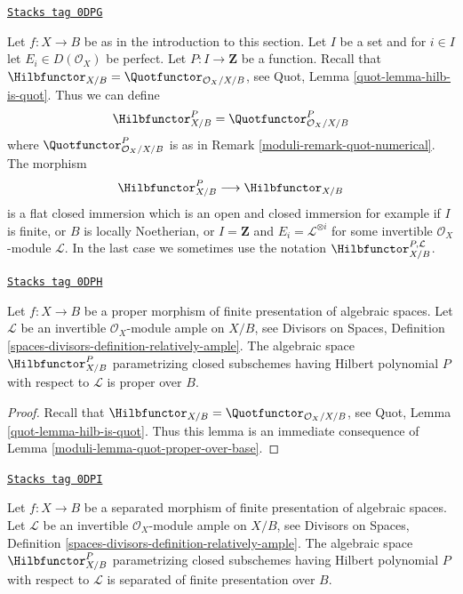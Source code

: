 \begin{remark}

\label{moduli-remark-hilb-numerical}
\href{https://stacks.math.columbia.edu/tag/0DPG}{\texttt{Stacks tag 0DPG}}

Let $f : X \to B$ be as in the introduction to this section.
Let $I$ be a set and for $i \in I$ let $E_i \in D(\mathcal{O}_X)$ be perfect.
Let $P : I \to \mathbf{Z}$ be a function. Recall that
$\Hilbfunctor_{X/B} = \Quotfunctor_{\mathcal{O}_X/X/B}$, see
Quot, Lemma \ref{quot-lemma-hilb-is-quot}.
Thus we can define
$$
\Hilbfunctor^P_{X/B} = \Quotfunctor^P_{\mathcal{O}_X/X/B}
$$
where $\Quotfunctor^P_{\mathcal{O}_X/X/B}$ is as in
Remark \ref{moduli-remark-quot-numerical}. The morphism
$$
\Hilbfunctor^P_{X/B} \longrightarrow \Hilbfunctor_{X/B}
$$
is a flat closed immersion which is an open and closed immersion
for example if $I$ is finite, or $B$ is locally Noetherian, or
$I = \mathbf{Z}$ and $E_i = \mathcal{L}^{\otimes i}$ for some
invertible $\mathcal{O}_X$-module $\mathcal{L}$. In the last case
we sometimes use the notation $\Hilbfunctor^{P, \mathcal{L}}_{X/B}$.
\end{remark}

\begin{lemma}
\label{moduli-lemma-hilb-proper-over-base}
\href{https://stacks.math.columbia.edu/tag/0DPH}{\texttt{Stacks tag 0DPH}}

Let $f : X \to B$ be a proper morphism of finite presentation
of algebraic spaces. Let $\mathcal{L}$ be an invertible
$\mathcal{O}_X$-module ample on $X/B$, see
Divisors on Spaces, Definition
\ref{spaces-divisors-definition-relatively-ample}.
The algebraic space $\Hilbfunctor^P_{X/B}$
parametrizing closed subschemes
having Hilbert polynomial $P$ with respect to $\mathcal{L}$
is proper over $B$.
\end{lemma}

\begin{proof}

Recall that $\Hilbfunctor_{X/B} = \Quotfunctor_{\mathcal{O}_X/X/B}$, see
Quot, Lemma \ref{quot-lemma-hilb-is-quot}.
Thus this lemma is an immediate consequence of
Lemma \ref{moduli-lemma-quot-proper-over-base}.
\end{proof}

\begin{lemma}
\label{moduli-lemma-hilb-qc-over-base}
\href{https://stacks.math.columbia.edu/tag/0DPI}{\texttt{Stacks tag 0DPI}}

Let $f : X \to B$ be a separated morphism of finite presentation
of algebraic spaces. Let $\mathcal{L}$ be an invertible
$\mathcal{O}_X$-module ample on $X/B$, see
Divisors on Spaces, Definition
\ref{spaces-divisors-definition-relatively-ample}.
The algebraic space $\Hilbfunctor^P_{X/B}$
parametrizing closed subschemes
having Hilbert polynomial $P$ with respect to $\mathcal{L}$
is separated of finite presentation over $B$.
\end{lemma}

